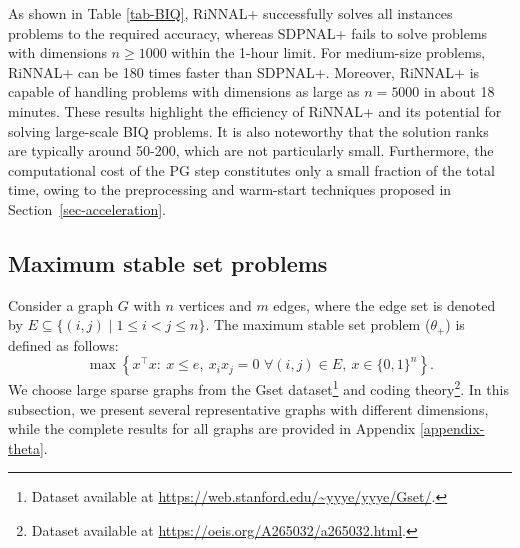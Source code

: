 \documentclass[11pt]{article}
\theoremstyle{plain}
\begin{document}
As shown in Table \ref{tab-BIQ}, RiNNAL+ successfully solves all instances problems to the required accuracy, whereas SDPNAL+ fails to solve problems with dimensions $n \geq 1000$ within the 1-hour limit. For medium-size problems, RiNNAL+ can be 180 times faster than SDPNAL+. Moreover, RiNNAL+ is capable of handling problems with dimensions as large as $n = 5000$ in about 18 minutes. These results highlight the efficiency of RiNNAL+ and its potential for solving large-scale BIQ problems. It is also noteworthy that the solution ranks are typically around 50-200, which are not particularly small. Furthermore, the computational cost of the PG step constitutes only a small fraction of the total time, owing to the preprocessing and warm-start techniques proposed in Section~\ref{sec-acceleration}.



\subsection{Maximum stable set problems}\label{subsec-theta}

Consider a graph $G$ with $n$ vertices and $m$ edges, where the edge set is denoted by $E \subseteq \{(i,j) \mid 1 \leq i < j \leq n\}$. The maximum stable set problem ($\theta_+$) is defined as follows:
\begin{equation}\label{prob-theta-v1}
\max\left\{x^{\top} x:\  x\leq e,\ x_ix_j=0\,\, \forall (i,j)\in E,\  x \in\{0,1\}^n\right\}.
\tag{$\theta_+$}
\end{equation}
We choose large sparse graphs from the Gset dataset\footnote{Dataset available at \url{https://web.stanford.edu/~yyye/yyye/Gset/}.} and coding theory\footnote{Dataset available at \url{https://oeis.org/A265032/a265032.html}.}. In this subsection, we present several representative graphs with different dimensions, while the complete results for all graphs are provided in Appendix \ref{appendix-theta}. 
\end{document}
